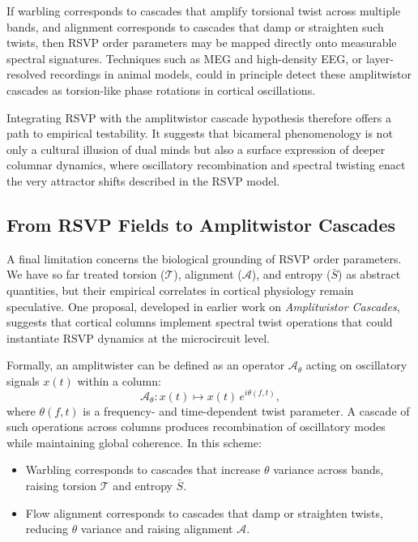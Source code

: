\documentclass[a4paper,11pt]{article}
\begin{document}
If warbling corresponds to cascades that amplify torsional twist across
multiple bands, and alignment corresponds to cascades that damp or straighten
such twists, then RSVP order parameters may be mapped directly onto measurable
spectral signatures. Techniques such as MEG and high-density EEG, or
layer-resolved recordings in animal models, could in principle detect these
amplitwistor cascades as torsion-like phase rotations in cortical oscillations.

Integrating RSVP with the amplitwistor cascade hypothesis therefore offers a
path to empirical testability. It suggests that bicameral phenomenology is not
only a cultural illusion of dual minds but also a surface expression of deeper
columnar dynamics, where oscillatory recombination and spectral twisting enact
the very attractor shifts described in the RSVP model.

\subsection{From RSVP Fields to Amplitwistor Cascades}

A final limitation concerns the biological grounding of RSVP order parameters.
We have so far treated torsion ($\mathcal{T}$), alignment ($\mathcal{A}$), and
entropy ($\bar{S}$) as abstract quantities, but their empirical correlates in
cortical physiology remain speculative. One proposal, developed in earlier work
on \emph{Amplitwistor Cascades}, suggests that cortical columns implement
spectral twist operations that could instantiate RSVP dynamics at the
microcircuit level.

Formally, an amplitwister can be defined as an operator $\mathcal{A}_\theta$
acting on oscillatory signals $x(t)$ within a column:
\begin{equation}
\mathcal{A}_\theta : x(t) \mapsto x(t)\,e^{i\theta(f,t)} ,
\end{equation}
where $\theta(f,t)$ is a frequency- and time-dependent twist parameter. A
cascade of such operations across columns produces recombination of oscillatory
modes while maintaining global coherence. In this scheme:
\begin{itemize}
    \item Warbling corresponds to cascades that increase $\theta$ variance
    across bands, raising torsion $\mathcal{T}$ and entropy $\bar{S}$.
    \item Flow alignment corresponds to cascades that damp or straighten twists,
    reducing $\theta$ variance and raising alignment $\mathcal{A}$.
\end{itemize}
\end{document}
